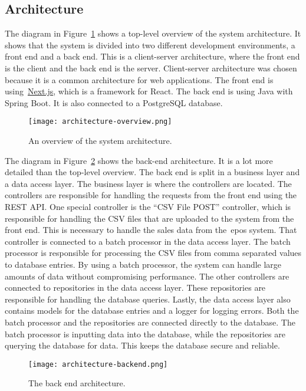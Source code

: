 \subsection{Architecture}\label{subsec:architecture}

The diagram in Figure~\ref{fig:architecture-overview} shows a top-level overview of the system architecture.
It shows that the system is divided into two different development environments, a front end and a back end.
This is a client-server architecture, where the front end is the client and the back end is the server.
Client-server architecture was chosen because it is a common architecture for web applications.
The front end is using~\url{Next.js}, which is a framework for React.
The back end is using Java with Spring Boot.
It is also connected to a PostgreSQL database.

\begin{figure}[H]
    \centering
    \texttt{[image: architecture-overview.png]}
    \caption{An overview of the system architecture.
    }\label{fig:architecture-overview}
\end{figure}

The diagram in Figure~\ref{fig:architecture-backend} shows the back-end architecture.
It is a lot more detailed than the top-level overview.
The back end is split in a business layer and a data access layer.
The business layer is where the controllers are located.
The controllers are responsible for handling the requests from the front end using the REST API.\@
One special controller is the ``CSV File POST'' controller, which is responsible for handling the CSV files that
are uploaded to the system from the front end.
This is necessary to handle the sales data from the~\acrshort{epos} system.
That controller is connected to a batch processor in the data access layer.
The batch processor is responsible for processing the CSV files from comma separated values to database entries.
By using a batch processor, the system can handle large amounts of data without compromising performance.
The other controllers are connected to repositories in the data access layer.
These repositories are responsible for handling the database queries.
Lastly, the data access layer also contains models for the database entries and a logger for logging errors.
Both the batch processor and the repositories are connected directly to the database.
The batch processor is inputting data into the database, while the repositories are querying the database for data.
This keeps the database secure and reliable.

\begin{figure}[H]
    \centering
    \texttt{[image: architecture-backend.png]}
    \caption{The back end architecture.
    }\label{fig:architecture-backend}
\end{figure}
